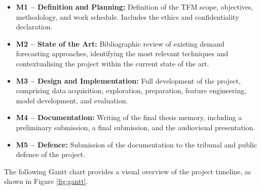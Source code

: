 \documentclass[ENG]{TFUOC}%
\begin{document}
\begin{itemize}
    \item \textbf{M1 -- Definition and Planning:} 
    Definition of the TFM scope, objectives, methodology, and 
    work schedule. Includes the ethics and confidentiality 
    declaration.

    \item \textbf{M2 -- State of the Art:} 
    Bibliographic review of existing demand forecasting approaches, 
    identifying the most relevant techniques and contextualising 
    the project within the current state of the art.

    \item \textbf{M3 -- Design and Implementation:} 
    Full development of the project, comprising data acquisition, 
    exploration, preparation, feature engineering, model 
    development, and evaluation.

    \item \textbf{M4 -- Documentation:} Writing of 
    the final thesis memory, including a preliminary submission, a final submission, and the audiovisual 
    presentation.

    \item \textbf{M5 -- Defence:} Submission of the 
    documentation to the tribunal and public defence of 
    the project.
\end{itemize}

The following Gantt chart provides a visual overview of the 
project timeline, as shown in Figure \ref{fig:gantt}.
\end{document}
